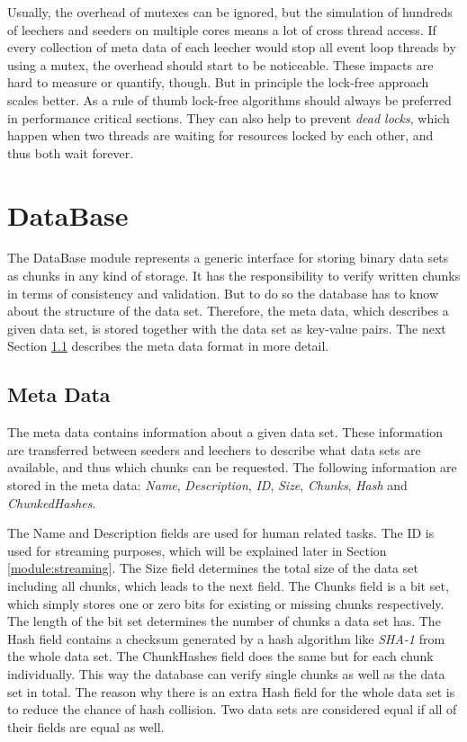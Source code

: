 Usually, the overhead of mutexes can be ignored, but the simulation of hundreds of leechers and seeders on multiple cores means a lot of cross thread access. If every collection of meta data of each leecher would stop all event loop threads by using a mutex, the overhead should start to be noticeable. These impacts are hard to measure or quantify, though. But in principle the lock-free approach scales better. As a rule of thumb lock-free algorithms should always be preferred in performance critical sections. They can also help to prevent \emph{dead locks}, which happen when two threads are waiting for resources locked by each other, and thus both wait forever.


\section{DataBase}
\label{module:database}
The DataBase module represents a generic interface for storing binary data sets as chunks in any kind of storage. It has the responsibility to verify written chunks in terms of consistency and validation. But to do so the database has to know about the structure of the data set. Therefore, the meta data, which describes a given data set, is stored together with the data set as key-value pairs. The next Section \ref{module:database:metadata} describes the meta data format in more detail.


\subsection{Meta Data}
\label{module:database:metadata}
The meta data contains information about a given data set. These information are transferred between seeders and leechers to describe what data sets are available, and thus which chunks can be requested. The following information are stored in the meta data: \emph{Name}, \emph{Description}, \emph{ID}, \emph{Size}, \emph{Chunks}, \emph{Hash} and \emph{ChunkedHashes}.

The Name and Description fields are used for human related tasks. The ID is used for streaming purposes, which will be explained later in Section \ref{module:streaming}. The Size field determines the total size of the data set including all chunks, which leads to the next field. The Chunks field is a bit set, which simply stores one or zero bits for existing or missing chunks respectively. The length of the bit set determines the number of chunks a data set has. The Hash field contains a checksum generated by a hash algorithm like \emph{SHA-1} from the whole data set. The ChunkHashes field does the same but for each chunk individually. This way the database can verify single chunks as well as the data set in total. The reason why there is an extra Hash field for the whole data set is to reduce the chance of hash collision. Two data sets are considered equal if all of their fields are equal as well.



